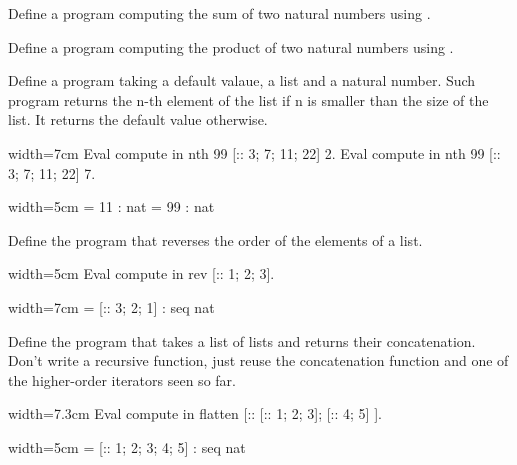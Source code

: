 \begin{Exercise}[label=ex:iteradd,difficulty=0,title={Addition with iteration}]
Define a program computing the sum of two natural numbers
using .
\end{Exercise}

\begin{Exercise}[label=ex:itermul,difficulty=0,title={Multiplication with iteration}]
Define a program computing the product of two natural numbers
using .
\end{Exercise}

\begin{Exercise}[label=ex:nth,difficulty=0,title={Find the n-th element}]
Define a program taking a default valaue, a list and  a natural number.  Such
program returns the n-th element of the list if n is smaller than the size of
the list.  It returns the default value otherwise.

\begin{coq}{}{width=7cm}
Eval compute in
  nth 99 [:: 3; 7; 11; 22] 2.
Eval compute in
  nth 99 [:: 3; 7; 11; 22] 7.
\end{coq}
\begin{coqout}{}{width=5cm}
     = 11
     : nat
     = 99
     : nat
\end{coqout}
\end{Exercise}

\begin{Exercise}[label=ex:rev,difficulty=0,title={List reversal}]
Define the program  that reverses the order of the elements
of a list. 

\begin{coq}{}{width=5cm}
Eval compute in
  rev [:: 1; 2; 3].
\end{coq}
\begin{coqout}{}{width=7cm}
 = [:: 3; 2; 1]
 : seq nat
\end{coqout}
\end{Exercise}

\begin{Exercise}[label=ex:flatten,difficulty=1,title={List flattening}]
Define the program  that takes a list of lists and returns
their concatenation.  Don't write a recursive function, just reuse
the concatenation function and one of the higher-order iterators
seen so far.

\begin{coq}{}{width=7.3cm}
Eval compute in
  flatten [:: [:: 1; 2; 3]; [:: 4; 5] ].
\end{coq}
\begin{coqout}{}{width=5cm}
 = [:: 1; 2; 3; 4; 5]
 : seq nat
\end{coqout}
\end{Exercise}


